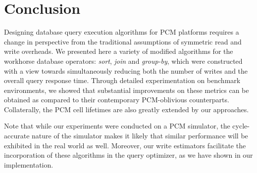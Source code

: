 \section{Conclusion}
\label{conclusion}
Designing database query execution algorithms for PCM platforms
requires a change in perspective from the traditional assumptions of
symmetric read and write overheads.  We presented here a variety of
modified algorithms for the workhorse database operators: \emph{sort},
\emph{join} and \emph{group-by}, which were constructed with a view
towards simultaneously reducing both the number of writes and the
overall query response time. Through detailed experimentation on benchmark
environments, we showed that substantial improvements on these metrics can
be obtained as compared to their contemporary PCM-oblivious counterparts.
Collaterally, the PCM cell lifetimes are also greatly extended by our
approaches.

Note that while our experiments were conducted on a PCM simulator, the
cycle-accurate nature of the simulator makes it likely that similar
performance will be exhibited in the real world as well. Moreover,
our write estimators facilitate the incorporation of these algorithms
in the query optimizer, as we have shown in our implementation.